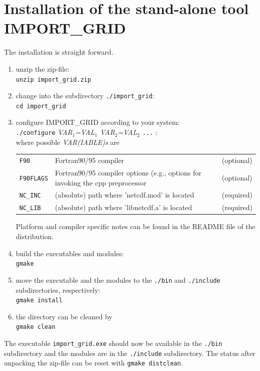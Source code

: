 \documentclass[11pt,twoside]{report}
\begin{document}
\section{Installation of the stand-alone tool IMPORT\_GRID}
The installation is straight forward.
\begin{enumerate}
\item unzip the zip-file:\\
\verb|unzip import_grid.zip|
\item change into the subdirectory \verb|./import_grid|:\\
\verb|cd import_grid|
\item configure IMPORT\_GRID according to your system:\\
\verb|./configure| {\it VAR$_1$=VAL$_1$  VAR$_2$=VAL$_2$} \verb|...|  :\\

     where possible {\it VAR(IABLE)s} are\\
\begin{tabular}{lll}
     \verb|F90|      & Fortran90/95 compiler&(optional)\\
      \verb|F90FLAGS|& Fortran90/95 compiler options (e.g., options for invoking the cpp preprocessor&(optional)\\
      \verb|NC_INC| &  (absolute) path where 'netcdf.mod' is located&(required)\\
      \verb|NC_LIB| &  (absolute) path where 'libnetcdf.a' is located&(required)\\
\end{tabular}

Platform and compiler specific notes can be found in the README file of the distribution.
\item build the executables and modules:\\
\verb|gmake|
\item move the executable and the modules to the \verb|./bin| and \verb|./include| subdirectories, respectively:\\
\verb|gmake install|
\item the directory can be cleaned by\\
\verb|gmake clean|
\end{enumerate}
The executable \verb|import_grid.exe| should now be available in the  
\verb|./bin| subdirectory and the modules are in the \verb|./include| 
subdirectory. The status after unpacking the zip-file can be reset with
\verb|gmake distclean|.
\end{document}
